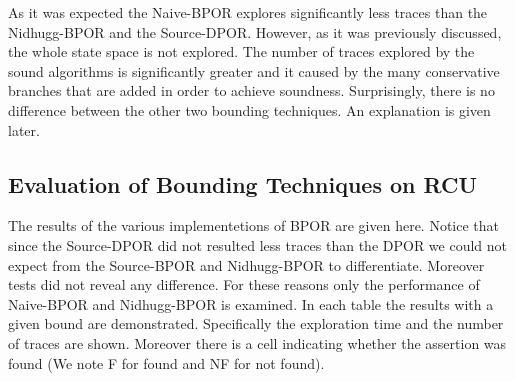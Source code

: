 

As it was expected the Naive-BPOR explores significantly less traces than the Nidhugg-BPOR and the Source-DPOR. However,
as it was previously discussed, the whole state space is not explored. The number of traces explored by the sound
algorithms is significantly greater and it caused by the many conservative branches that are added in order to achieve
soundness. Surprisingly, there is no difference between the other two bounding techniques. An explanation is given
later.

\subsection{Evaluation of Bounding Techniques on RCU}
The results of the various implementetions of BPOR are given here. Notice that since the Source-DPOR did not resulted
less traces than the DPOR we could not expect from the Source-BPOR and Nidhugg-BPOR to differentiate. Moreover tests did not
reveal any difference. For these reasons only the performance of Naive-BPOR and Nidhugg-BPOR is examined. In each table the
results with a given bound are demonstrated. Specifically the exploration time and the number of traces are shown.
Moreover there is a cell indicating whether the assertion was found (We note F for found and NF for not found).




